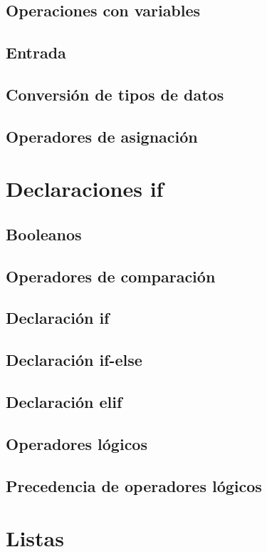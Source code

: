 \documentclass{article}
\begin{document}
      \subsection{Operaciones con variables}
      \subsection{Entrada}
      \subsection{Conversión de tipos de datos}
      \subsection{Operadores de asignación}
    
    \section{Declaraciones if}

      \subsection{Booleanos}
      \subsection{Operadores de comparación}
      \subsection{Declaración if}
      \subsection{Declaración if-else}
      \subsection{Declaración elif}
      \subsection{Operadores lógicos}
      \subsection{Precedencia de operadores lógicos}

    \section{Listas}
\end{document}
